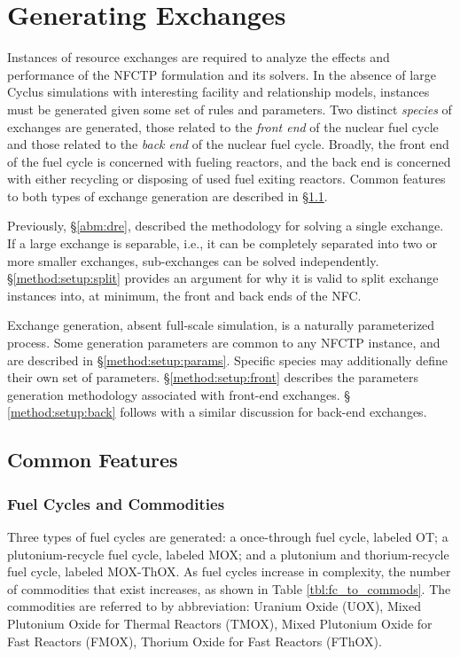 
\section{Generating Exchanges}\label{method:setup}

Instances of resource exchanges are required to analyze the effects and
performance of the NFCTP formulation and its solvers. In the absence of large
Cyclus simulations with interesting facility and relationship models, instances
must be generated given some set of rules and parameters. Two distinct
\textit{species} of exchanges are generated, those related to the \textit{front
  end} of the nuclear fuel cycle and those related to the \textit{back end} of
the nuclear fuel cycle. Broadly, the front end of the fuel cycle is concerned
with fueling reactors, and the back end is concerned with either recycling or
disposing of used fuel exiting reactors. Common features to both types of
exchange generation are described in \S \ref{method:setup:features}.

Previously, \S \ref{abm:dre}, described the methodology for solving a single
exchange. If a large exchange is separable, i.e., it can be completely separated
into two or more smaller exchanges, sub-exchanges can be solved
independently. \S \ref{method:setup:split} provides an argument for why it is
valid to split exchange instances into, at minimum, the front and back ends of
the NFC.

Exchange generation, absent full-scale simulation, is a naturally parameterized
process. Some generation parameters are common to any NFCTP instance, and are
described in \S \ref{method:setup:params}. Specific species may additionally
define their own set of parameters. \S \ref{method:setup:front} describes the
parameters generation methodology associated with front-end exchanges. \S
\ref{method:setup:back} follows with a similar discussion for back-end
exchanges.

\subsection{Common Features}\label{method:setup:features}

\subsubsection{Fuel Cycles and Commodities}

Three types of fuel cycles are generated: a once-through fuel cycle, labeled
OT; a plutonium-recycle fuel cycle, labeled MOX; and a plutonium and
thorium-recycle fuel cycle, labeled MOX-ThOX. As fuel cycles increase in
complexity, the number of commodities that exist increases, as shown in Table
\ref{tbl:fc_to_commods}. The commodities are referred to by abbreviation:
Uranium Oxide (UOX), Mixed Plutonium Oxide for Thermal Reactors (TMOX), Mixed
Plutonium Oxide for Fast Reactors (FMOX), Thorium Oxide for Fast Reactors
(FThOX).

